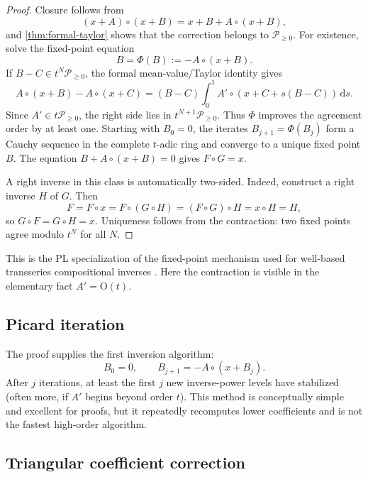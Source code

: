 \documentclass[11pt,oneside]{article}
\numberwithin{equation}{section}
\theoremstyle{definition}
\newcommand{\PL}{\mathscr P}
\newcommand{\bigO}{\mathrm{O}}
\newcommand{\dd}{\,\mathrm d}
\begin{document}
\begin{proof}
Closure follows from
\[
  (x+A)\circ(x+B)=x+B+A\circ(x+B),
\]
and \cref{thm:formal-taylor} shows that the correction belongs to
\(\PL_{\ge0}\).  For existence, solve the fixed-point equation
\begin{equation}\label{eq:fixed-point-B}
  B=\Phi(B):=-A\circ(x+B).
\end{equation}
If \(B-C\in t^N\PL_{\ge0}\), the formal mean-value/Taylor identity gives
\[
  A\circ(x+B)-A\circ(x+C)
  =(B-C)\int_0^1 A'\circ(x+C+s(B-C))\dd s.
\]
Since \(A'\in t\PL_{\ge0}\), the right side lies in
\(t^{N+1}\PL_{\ge0}\).  Thus \(\Phi\) improves the agreement order by at least
one.  Starting with \(B_0=0\), the iterates
\(B_{j+1}=\Phi(B_j)\) form a Cauchy sequence in the complete \(t\)-adic ring and
converge to a unique fixed point \(B\).  The equation
\(B+A\circ(x+B)=0\) gives \(F\circ G=x\).

A right inverse in this class is automatically two-sided.  Indeed, construct a
right inverse \(H\) of \(G\).  Then
\[
  F=F\circ x=F\circ(G\circ H)=(F\circ G)\circ H=x\circ H=H,
\]
so \(G\circ F=G\circ H=x\).  Uniqueness follows from the contraction: two fixed
points agree modulo \(t^N\) for all \(N\).
\end{proof}

This is the PL specialization of the fixed-point mechanism used for
well-based transseries compositional inverses \cite{EdgarComposition}.  Here the
contraction is visible in the elementary fact \(A'=\bigO(t)\).

\subsection{Picard iteration}

The proof supplies the first inversion algorithm:
\begin{equation}\label{eq:picard-reversion}
  B_0=0,
  \qquad B_{j+1}=-A\circ(x+B_j).
\end{equation}
After \(j\) iterations, at least the first \(j\) new inverse-power levels have
stabilized (often more, if \(A'\) begins beyond order \(t\)).  This method is
conceptually simple and excellent for proofs, but it repeatedly recomputes lower
coefficients and is not the fastest high-order algorithm.

\subsection{Triangular coefficient correction}
\end{document}
